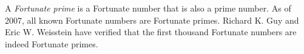 \documentclass[12pt]{article}
\begin{document}
A {\em Fortunate prime} is a Fortunate number that is also a prime number. As of 2007, all known Fortunate numbers are Fortunate primes. Richard K. Guy and Eric W. Weisstein have verified that the first thousand Fortunate numbers are indeed Fortunate primes.
\end{document}
